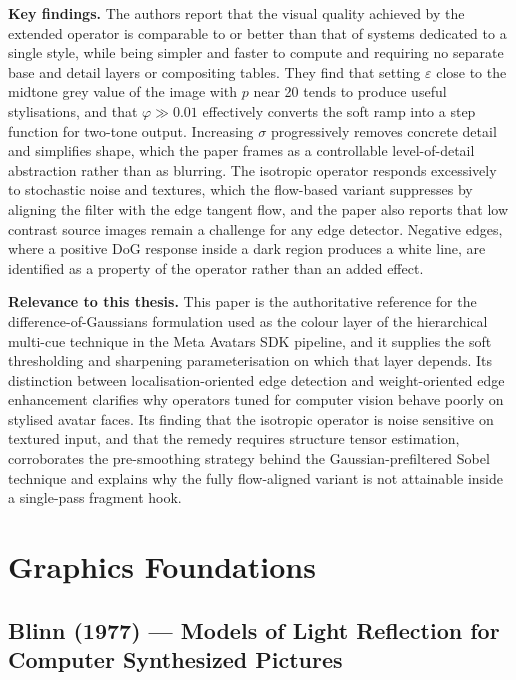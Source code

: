 \documentclass[11pt, a4paper]{article}
\begin{document}
\textbf{Key findings.} The authors report that the visual quality achieved by the extended operator is comparable to or better than that of systems dedicated to a single style, while being simpler and faster to compute and requiring no separate base and detail layers or compositing tables. They find that setting $\varepsilon$ close to the midtone grey value of the image with $p$ near 20 tends to produce useful stylisations, and that $\varphi \gg 0.01$ effectively converts the soft ramp into a step function for two-tone output. Increasing $\sigma$ progressively removes concrete detail and simplifies shape, which the paper frames as a controllable level-of-detail abstraction rather than as blurring. The isotropic operator responds excessively to stochastic noise and textures, which the flow-based variant suppresses by aligning the filter with the edge tangent flow, and the paper also reports that low contrast source images remain a challenge for any edge detector. Negative edges, where a positive DoG response inside a dark region produces a white line, are identified as a property of the operator rather than an added effect.

\textbf{Relevance to this thesis.} This paper is the authoritative reference for the difference-of-Gaussians formulation used as the colour layer of the hierarchical multi-cue technique in the Meta Avatars SDK pipeline, and it supplies the soft thresholding and sharpening parameterisation on which that layer depends. Its distinction between localisation-oriented edge detection and weight-oriented edge enhancement clarifies why operators tuned for computer vision behave poorly on stylised avatar faces. Its finding that the isotropic operator is noise sensitive on textured input, and that the remedy requires structure tensor estimation, corroborates the pre-smoothing strategy behind the Gaussian-prefiltered Sobel technique and explains why the fully flow-aligned variant is not attainable inside a single-pass fragment hook.

\vspace{8pt}

\clearpage
\section{Graphics Foundations}

\subsection{Blinn (1977) --- Models of Light Reflection for Computer Synthesized Pictures}
\end{document}
